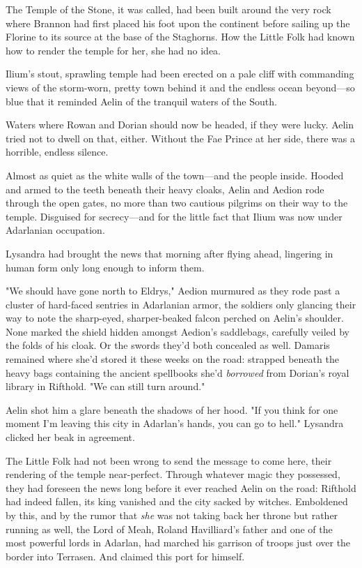 The Temple of the Stone, it was called, had been built around the very rock where Brannon had first placed his foot upon the continent before sailing up the Florine to its source at the base of the Staghorns.
How the Little Folk had known how to render the temple for her, she had no idea.

Ilium's stout, sprawling temple had been erected on a pale cliff with commanding views of the storm-worn, pretty town behind it and the endless ocean beyond---so blue that it reminded Aelin of the tranquil waters of the South.

Waters where Rowan and Dorian should now be headed, if they were lucky.
Aelin tried not to dwell on that, either.
Without the Fae Prince at her side, there was a horrible, endless silence.

Almost as quiet as the white walls of the town---and the people inside.
Hooded and armed to the teeth beneath their heavy cloaks, Aelin and Aedion rode through the open gates, no more than two cautious pilgrims on their way to the temple.
Disguised for secrecy---and for the little fact that Ilium was now under Adarlanian occupation.

Lysandra had brought the news that morning after flying ahead, lingering in human form only long enough to inform them.

"We should have gone north to Eldrys," Aedion murmured as they rode past a cluster of hard-faced sentries in Adarlanian armor, the soldiers only glancing their way to note the sharp-eyed, sharper-beaked falcon perched on Aelin's shoulder.
None marked the shield hidden amongst Aedion's saddlebags, carefully veiled by the folds of his cloak.
Or the swords they'd both concealed as well.
Damaris remained where she'd stored it these weeks on the road: strapped beneath the heavy bags containing the ancient spellbooks she'd \emph{borrowed} from Dorian's royal library in Rifthold.
"We can still turn around."

Aelin shot him a glare beneath the shadows of her hood.
"If you think for one moment I'm leaving this city in Adarlan's hands, you can go to hell."
Lysandra clicked her beak in agreement.

The Little Folk had not been wrong to send the message to come here, their rendering of the temple near-perfect.
Through whatever magic they possessed, they had foreseen the news long before it ever reached Aelin on the road: Rifthold had indeed fallen, its king vanished and the city sacked by witches.
Emboldened by this, and by the rumor that \emph{she}
was not taking back her throne but rather running as well, the Lord of Meah, Roland Havilliard's father and one of the most powerful lords in Adarlan, had marched his garrison of troops just over the border into Terrasen.
And claimed this port for himself.

